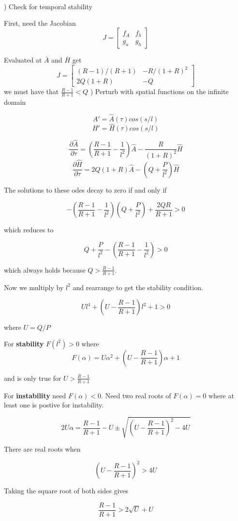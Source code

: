 \documentclass[]{article}
\numberwithin{equation}{section}		%
\begin{document}
) Check for temporal stability

First, need the Jacobian
$$J=
\begin{bmatrix}
f_A&   f_h\\
g_a &   g_h
\end{bmatrix}$$

Evaluated at $\bar{A}$ and $\bar{H}$ get
$$J=
\begin{bmatrix}
(R-1)/(R+1)&    -R/(1+R)^2\\
2Q(1+R) &   -Q
\end{bmatrix}$$
 we must have that $\frac{R-1}{R+1}<Q$
) Perturb with spatial functions on the infinite domain

$$A'=\hat{A}(\tau)cos(s/l)$$
$$H'=\hat{H}(\tau)cos(s/l)$$

$$\frac{\partial\hat{A}}{\partial\tau}=\left(\frac{R-1}{R+1}-\frac{1}{l^2}\right)\hat{A}-\frac{R}{(1+R)^2}\hat{H}$$
$$\frac{\partial\hat{H}}{\partial\tau}=2Q(1+R)\hat{A}-\left(Q+\frac{P}{l^2}\right)\hat{H}$$

The solutions to these odes decay to zero if and only if

$$-\left(\frac{R-1}{R+1}-\frac{1}{l^2}\right)\left(Q+\frac{P}{l^2}\right)+\frac{2QR}{R+1}>0$$

which reduces to

$$Q+\frac{P}{l^2}-\left(\frac{R-1}{R+1}-\frac{1}{l^2}\right)>0$$

which always holds because $Q>\frac{R-1}{R+1}$.

Now we multiply by $l^2$ and rearrange to get the stability condition.

$$Ul^4+\left(U-\frac{R-1}{R+1}\right)l^2+1>0$$

where $U=Q/P$

For \textbf{stability} $F(l^2)>0$ where
$$F(\alpha)=U\alpha^2+\left(U-\frac{R-1}{R+1}\right)\alpha+1$$

and is only true for $U>\frac{R-1}{R+1}$

For \textbf{instability} need $F(\alpha)<0$.  Need two real roots of $F(\alpha)=0$ where at least one is postive for instability.

$$2U\alpha=\frac{R-1}{R+1}-U\pm\sqrt{\left(U-\frac{R-1}{R+1}\right)^2-4U}$$

There are real roots when

$$\left(U-\frac{R-1}{R+1}\right)^2>4U$$

Taking the square root of both sides gives

$$\frac{R-1}{R+1}>2\sqrt{U}+U$$
\end{document}
